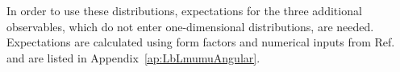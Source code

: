 %
In order to use these distributions, expectations for the three additional observables,
which do not enter one-dimensional distributions, are needed.
Expectations are calculated using form factors and numerical inputs from Ref.~\cite{Gutsche:2013pp}
and are listed in Appendix~\ref{ap:LbLmumuAngular}.
%
%
%
%
%

